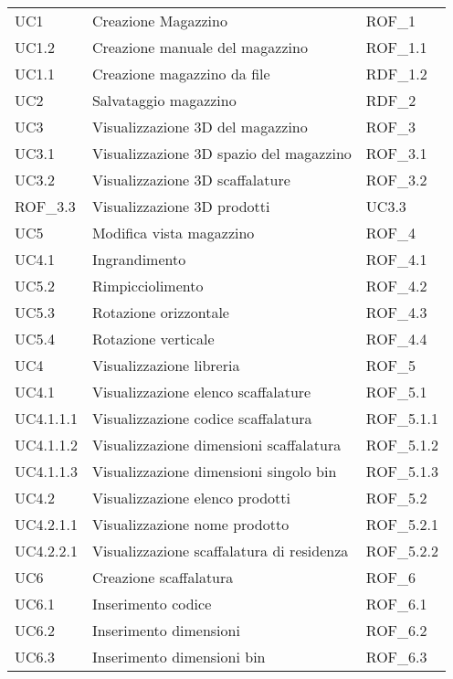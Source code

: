 \begin{xltabular}{\textwidth}{ p{0.3\textwidth} | X | p{0.2\textwidth} }
    UC1 & Creazione Magazzino & ROF\_1\\
    UC1.2 & Creazione manuale del magazzino & ROF\_1.1\\
    UC1.1 & Creazione magazzino da file & RDF\_1.2\\
    UC2 & Salvataggio magazzino & RDF\_2\\
    UC3 & Visualizzazione 3D del magazzino & ROF\_3\\
    UC3.1 & Visualizzazione 3D spazio del magazzino & ROF\_3.1\\
    UC3.2 & Visualizzazione 3D scaffalature & ROF\_3.2\\
    ROF\_3.3 & Visualizzazione 3D prodotti & UC3.3\\
    UC5 & Modifica vista magazzino & ROF\_4\\
    UC4.1 & Ingrandimento & ROF\_4.1\\ 
    UC5.2 & Rimpicciolimento & ROF\_4.2\\ 
    UC5.3 & Rotazione orizzontale & ROF\_4.3\\ 
    UC5.4 & Rotazione verticale & ROF\_4.4\\ 
    UC4 & Visualizzazione libreria & ROF\_5\\ 
    UC4.1 & Visualizzazione elenco scaffalature & ROF\_5.1\\ 
    UC4.1.1.1 & Visualizzazione codice scaffalatura & ROF\_5.1.1\\
    UC4.1.1.2 & Visualizzazione dimensioni scaffalatura & ROF\_5.1.2\\ 
    UC4.1.1.3 & Visualizzazione dimensioni singolo bin & ROF\_5.1.3\\ 
    UC4.2 & Visualizzazione elenco prodotti & ROF\_5.2\\ 
    UC4.2.1.1 & Visualizzazione nome prodotto & ROF\_5.2.1\\
    UC4.2.2.1 & Visualizzazione scaffalatura di residenza & ROF\_5.2.2\\ 
    UC6 & Creazione scaffalatura & ROF\_6\\
    UC6.1 & Inserimento codice & ROF\_6.1\\
    UC6.2 & Inserimento dimensioni & ROF\_6.2\\
    UC6.3 & Inserimento dimensioni bin & ROF\_6.3\\

\end{xltabular}

